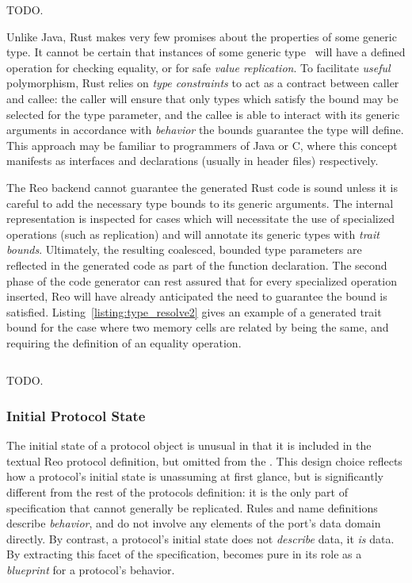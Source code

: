 \begin{listing}[ht]
	\centering
	\inputminted[]{rust}{type_resolve.rs}
	\caption[TODO.]{TODO.}
	\label{listing:type_resolve}
\end{listing}

Unlike Java, Rust makes very few promises about the properties of some generic type. It cannot be certain that instances of some generic type~ will have a defined operation for checking equality, or for safe \textit{value replication}. To facilitate \textit{useful} polymorphism, Rust relies on \textit{type constraints} to act as a contract between caller and callee: the caller will ensure that only types which satisfy the bound may be selected for the type parameter, and the callee is able to interact with its generic arguments in accordance with \textit{behavior} the bounds guarantee the type will define. This approach may be familiar to programmers of Java or C, where this concept manifests as interfaces and declarations (usually in header files) respectively. 

The Reo backend cannot guarantee the generated Rust code is sound unless it is careful to add the necessary type bounds to its generic arguments. The internal representation is inspected for cases which will necessitate the use of specialized operations (such as replication) and will annotate its generic types with \textit{trait bounds}. Ultimately, the resulting coalesced, bounded type parameters are reflected in the generated code as part of the function declaration. The second phase of the code generator can rest assured that for every specialized operation inserted, Reo will have already anticipated the need to guarantee the bound is satisfied. Listing~\ref{listing:type_resolve2} gives an example of a generated trait bound for the case where two memory cells are related by being the same, and requiring the definition of an equality operation.

\begin{listing}[ht]
	\centering
	\inputminted[]{rust}{type_resolve2.rs}
	\caption[TODO.]{TODO.}
	\label{listing:type_resolve2}
\end{listing}


\subsubsection{Initial Protocol State}
The initial state of a protocol object is unusual in that it is included in the textual Reo protocol definition, but omitted from the . This design choice reflects how a protocol's initial state is unassuming at first glance, but is significantly different from the rest of the protocols definition: it is the only part of specification that cannot generally be replicated. Rules and name definitions describe \textit{behavior}, and do not involve any elements of the port's data domain directly. By contrast, a protocol's initial state does not \textit{describe} data, it \textit{is} data. By extracting this facet of the specification,  becomes pure in its role as a \textit{blueprint} for a protocol's behavior. 

